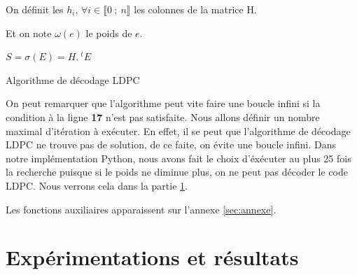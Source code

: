 \documentclass[french,nochapter,11pt]{rapportUB}
\begin{document}
\begin{algorithm}[H]
  \SetAlgoLined

  On définit les $h_{i}$, $\forall i \in \llbracket 0~;~ n \rrbracket$ les colonnes de la matrice H.
  
  Et on note $\omega(e)$ le poids de $e$.

  $S = \sigma(E) = H.~^tE$
  

  \caption{Algorithme de décodage LDPC}
\end{algorithm}
\vspace{0.4cm}
On peut remarquer que l'algorithme peut vite faire une boucle infini si la condition à la ligne 
\textbf{\textsc{17}} n'est pas satisfaite.
Nous allons définir un nombre maximal d'itération à exécuter. En effet, il se peut que l'algorithme 
de décodage LDPC ne trouve pas de solution, de ce faite, on évite une boucle infini.\vspace{0.4cm}\newline
Dans notre implémentation Python, nous avons fait le choix d'éxécuter au plus 25 fois la recherche puisque 
si le poids ne diminue plus, on ne peut pas décoder le code LDPC. Nous verrons cela dans la partie \ref{sec:exp}.
\clearpage

\vspace{0.5cm} Les fonctions auxiliaires apparaissent sur l'annexe \ref{sec:annexe}.
\clearpage

\section{Expérimentations et résultats}
\label{sec:exp}
\end{document}
